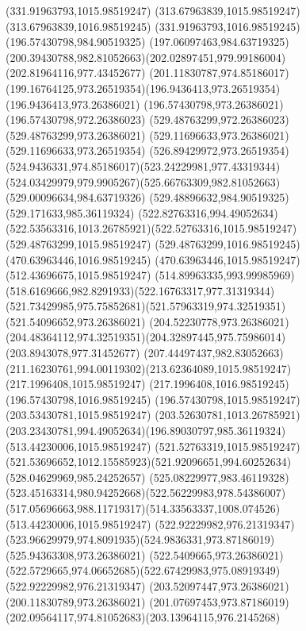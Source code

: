 {{	\moveto(331.91963793,1015.98519247)
	\lineto(313.67963839,1015.98519247)
	\lineto(313.67963839,1016.98519245)
	\lineto(331.91963793,1016.98519245)
	\closepath
	\moveto(196.57430798,984.90519325)
	\lineto(197.06097463,984.63719325)
	\curveto(200.39430788,982.81052663)(202.02897451,979.99186004)(202.81964116,977.43452677)
	\curveto(201.11830787,974.85186017)(199.16764125,973.26519354)(196.9436413,973.26519354)
	\lineto(196.9436413,973.26386021)
	\lineto(196.57430798,973.26386021)
	\lineto(196.57430798,972.26386023)
	\lineto(529.48763299,972.26386023)
	\lineto(529.48763299,973.26386021)
	\lineto(529.11696633,973.26386021)
	\lineto(529.11696633,973.26519354)
	\curveto(526.89429972,973.26519354)(524.9436331,974.85186017)(523.24229981,977.43319344)
	\curveto(524.03429979,979.9905267)(525.66763309,982.81052663)(529.00096634,984.63719326)
	\lineto(529.48896632,984.90519325)
	\lineto(529.171633,985.36119324)
	\curveto(522.82763316,994.49052634)(522.53563316,1013.26785921)(522.52763316,1015.98519247)
	\lineto(529.48763299,1015.98519247)
	\lineto(529.48763299,1016.98519245)
	\lineto(470.63963446,1016.98519245)
	\lineto(470.63963446,1015.98519247)
	\lineto(512.43696675,1015.98519247)
	\curveto(514.89963335,993.99985969)(518.6169666,982.8291933)(522.16763317,977.31319344)
	\curveto(521.73429985,975.75852681)(521.57963319,974.32519351)(521.54096652,973.26386021)
	\lineto(204.52230778,973.26386021)
	\curveto(204.48364112,974.32519351)(204.32897445,975.75986014)(203.8943078,977.31452677)
	\curveto(207.44497437,982.83052663)(211.16230761,994.00119302)(213.62364089,1015.98519247)
	\lineto(217.1996408,1015.98519247)
	\lineto(217.1996408,1016.98519245)
	\lineto(196.57430798,1016.98519245)
	\lineto(196.57430798,1015.98519247)
	\lineto(203.53430781,1015.98519247)
	\curveto(203.52630781,1013.26785921)(203.23430781,994.49052634)(196.89030797,985.36119324)
	\closepath
	\moveto(513.44230006,1015.98519247)
	\lineto(521.52763319,1015.98519247)
	\curveto(521.53696652,1012.15585923)(521.92096651,994.60252634)(528.04629969,985.24252657)
	\curveto(525.08229977,983.46119328)(523.45163314,980.94252668)(522.56229983,978.54386007)
	\curveto(517.05696663,988.11719317)(514.33563337,1008.074526)(513.44230006,1015.98519247)
	\moveto(522.92229982,976.21319347)
	\curveto(523.96629979,974.8091935)(524.9836331,973.87186019)(525.94363308,973.26386021)
	\lineto(522.5409665,973.26386021)
	\curveto(522.5729665,974.06652685)(522.67429983,975.08919349)(522.92229982,976.21319347)
	\moveto(203.52097447,973.26386021)
	\lineto(200.11830789,973.26386021)
	\curveto(201.07697453,973.87186019)(202.09564117,974.81052683)(203.13964115,976.2145268)
}}
